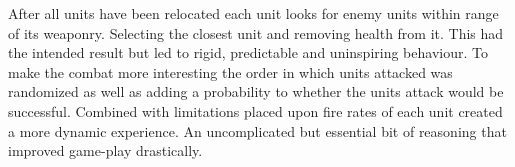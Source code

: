After all units have been relocated each unit looks for enemy units within range of its weaponry. Selecting the closest unit and removing health from it. This had the intended result but led to rigid, predictable and uninspiring behaviour. To make the combat more interesting the order in which units attacked was randomized as well as adding a probability to whether the units attack would be successful. Combined with limitations placed upon fire rates of each unit created a more dynamic experience. An uncomplicated but essential bit of reasoning that improved game-play drastically.
